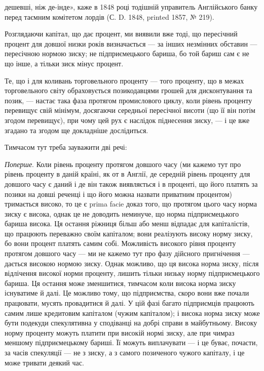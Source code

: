 \parcont{}  %
дешевші, ніж де-інде», каже в 1848 році тодішній управитель Англійського
банку перед таємним комітетом лордів (С. D. 1848, printed 1857, № 219).

Розглядаючи капітал, що дає процент, ми виявили вже тоді, що пересічний
процент для довшої низки років визначається — за інших незмінних обставин
— пересічною нормою зиску; не підприємецького бариша, бо той бариш
сам є не що інше, а тільки зиск мінус процент.

Те, що і для коливань торговельного проценту — того проценту, що в межах
торговельного світу обраховується позикодавцями грошей для дисконтування
та позик, — настає така фаза протягом промислового циклу, коли рівень проценту
перевищує свій мінімум, досягаючи середньої пересічної висоти (що її він
потім згодом перевищує), при чому цей рух є наслідок піднесення зиску, — і це
вже згадано та згодом ще докладніше дослідиться.

Тимчасом тут треба зауважити дві речі:

\emph{Поперше}. Коли рівень проценту протягом довшого часу (ми кажемо тут
про рівень проценту в даній країні, як от в Англії, де середній рівень проценту
для довшого часу є даний і де він також виявляється і в проценті, що його платять
за позики на довші реченці і що його можна назвати приватним процентом)
тримається високо, то це є prima facie доказ того, що протягом цього
часу норма зиску є висока, однак це не доводить неминуче, що норма підприємецького
бариша висока. Ця остання ріжниця більш або менш відпадає для
капіталістів, що працюють переважно своїм капіталом; вони реалізують високу
норму зиску, бо вони процент платять самим собі. Можливість високого рівня
проценту протягом довшого часу — ми не кажемо тут про фазу дійсного пригнічення
— дається високою нормою зиску. Однак можливо, що ця висока норма
зиску, після відлічення високої норми проценту, лишить тільки низьку норму
підприємецького бариша. Ця остання може зменшитися, тимчасом коли висока
норма зиску існуватиме й далі. Це можливо тому, що підприємства, скоро вони
вже почали працювати, мусять провадитися й далі. У цій фазі багато підприємців
працюють самим лише кредитовим капіталом (чужим капіталом); і висока
норма зиску може бути подекуди спекулятивна у сподіванці на добрі справи
в майбутньому. Високу норму проценту можуть платити при високій нормі зиску,
але при чимраз меншому підприємецькому бариші. Її можуть виплачувати —
і це буває, почасти, за часів спекуляції — не з зиску, а з самого позиченого
чужого капіталу, і це може тривати деякий час.

